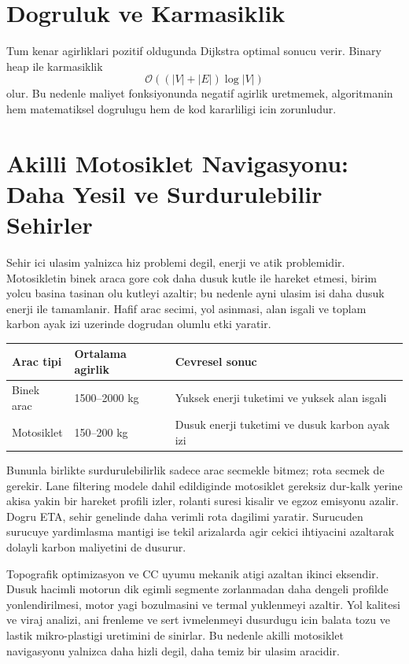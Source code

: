 ﻿\documentclass[11pt,a4paper]{article}
\begin{document}
\section{Dogruluk ve Karmasiklik}
\noindent Tum kenar agirliklari pozitif oldugunda Dijkstra optimal sonucu verir. Binary heap ile karmasiklik
\begin{equation}
\mathcal{O}((|V|+|E|)\log|V|)
\end{equation}
\noindent olur. Bu nedenle maliyet fonksiyonunda negatif agirlik uretmemek, algoritmanin hem matematiksel dogrulugu hem de kod kararliligi icin zorunludur.

\section{Akilli Motosiklet Navigasyonu: Daha Yesil ve Surdurulebilir Sehirler}
\noindent Sehir ici ulasim yalnizca hiz problemi degil, enerji ve atik problemidir. Motosikletin binek araca gore cok daha dusuk kutle ile hareket etmesi, birim yolcu basina tasinan olu kutleyi azaltir; bu nedenle ayni ulasim isi daha dusuk enerji ile tamamlanir. Hafif arac secimi, yol asinmasi, alan isgali ve toplam karbon ayak izi uzerinde dogrudan olumlu etki yaratir.

\begin{center}
\begin{tabular}{@{}lll@{}}
\toprule
Arac tipi & Ortalama agirlik & Cevresel sonuc \\
\midrule
Binek arac & 1500--2000 kg & Yuksek enerji tuketimi ve yuksek alan isgali \\
Motosiklet & 150--200 kg & Dusuk enerji tuketimi ve dusuk karbon ayak izi \\
\bottomrule
\end{tabular}
\end{center}

\noindent Bununla birlikte surdurulebilirlik sadece arac secmekle bitmez; rota secmek de gerekir. Lane filtering modele dahil edildiginde motosiklet gereksiz dur-kalk yerine akisa yakin bir hareket profili izler, rolanti suresi kisalir ve egzoz emisyonu azalir. Dogru ETA, sehir genelinde daha verimli rota dagilimi yaratir. Surucuden surucuye yardimlasma mantigi ise tekil arizalarda agir cekici ihtiyacini azaltarak dolayli karbon maliyetini de dusurur.

\noindent Topografik optimizasyon ve CC uyumu mekanik atigi azaltan ikinci eksendir. Dusuk hacimli motorun dik egimli segmente zorlanmadan daha dengeli profilde yonlendirilmesi, motor yagi bozulmasini ve termal yuklenmeyi azaltir. Yol kalitesi ve viraj analizi, ani frenleme ve sert ivmelenmeyi dusurdugu icin balata tozu ve lastik mikro-plastigi uretimini de sinirlar. Bu nedenle akilli motosiklet navigasyonu yalnizca daha hizli degil, daha temiz bir ulasim aracidir.
\end{document}

